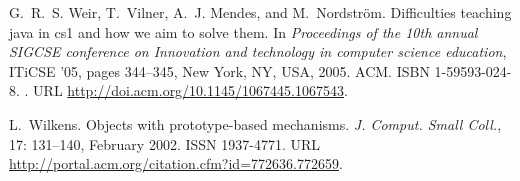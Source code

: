 \documentclass{sigplanconf}
\begin{document}
\begin{thebibliography}{}
G.~R.~S. Weir, T.~Vilner, A.~J. Mendes, and M.~Nordstr\"{o}m.
\newblock Difficulties teaching java in cs1 and how we aim to solve them.
\newblock In \emph{Proceedings of the 10th annual SIGCSE conference on
  Innovation and technology in computer science education}, ITiCSE '05, pages
  344--345, New York, NY, USA, 2005. ACM.
\newblock ISBN 1-59593-024-8.
\newblock {}.
\newblock URL \url{http://doi.acm.org/10.1145/1067445.1067543}.

L.~Wilkens.
\newblock Objects with prototype-based mechanisms.
\newblock \emph{J. Comput. Small Coll.}, 17: 131--140, February 2002.
\newblock ISSN 1937-4771.
\newblock URL \url{http://portal.acm.org/citation.cfm?id=772636.772659}.

\end{thebibliography}
\end{document}
